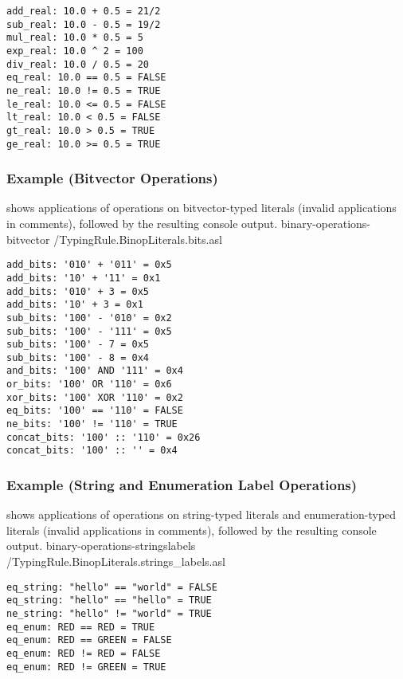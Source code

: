 \begin{Verbatim}[fontsize=\footnotesize, frame=single]
add_real: 10.0 + 0.5 = 21/2
sub_real: 10.0 - 0.5 = 19/2
mul_real: 10.0 * 0.5 = 5
exp_real: 10.0 ^ 2 = 100
div_real: 10.0 / 0.5 = 20
eq_real: 10.0 == 0.5 = FALSE
ne_real: 10.0 != 0.5 = TRUE
le_real: 10.0 <= 0.5 = FALSE
lt_real: 10.0 < 0.5 = FALSE
gt_real: 10.0 > 0.5 = TRUE
ge_real: 10.0 >= 0.5 = TRUE
\end{Verbatim}

\subsubsection{Example (Bitvector Operations)\label{sec:ExampleBitvectorOperations}}
 shows applications
of operations on bitvector-typed literals (invalid applications in comments),
followed by the resulting console output.
  {binary-operations-bitvector}
  {\typingtests/TypingRule.BinopLiterals.bits.asl}

\begin{Verbatim}[fontsize=\footnotesize, frame=single]
add_bits: '010' + '011' = 0x5
add_bits: '10' + '11' = 0x1
add_bits: '010' + 3 = 0x5
add_bits: '10' + 3 = 0x1
sub_bits: '100' - '010' = 0x2
sub_bits: '100' - '111' = 0x5
sub_bits: '100' - 7 = 0x5
sub_bits: '100' - 8 = 0x4
and_bits: '100' AND '111' = 0x4
or_bits: '100' OR '110' = 0x6
xor_bits: '100' XOR '110' = 0x2
eq_bits: '100' == '110' = FALSE
ne_bits: '100' != '110' = TRUE
concat_bits: '100' :: '110' = 0x26
concat_bits: '100' :: '' = 0x4
\end{Verbatim}

\subsubsection{Example (String and Enumeration Label Operations)\label{sec:StringLabelOperations}}
 shows applications
of operations on string-typed literals and enumeration-typed literals (invalid applications in comments),
followed by the resulting console output.
  {binary-operations-stringslabels}
  {\typingtests/TypingRule.BinopLiterals.strings_labels.asl}

\begin{Verbatim}[fontsize=\footnotesize, frame=single]
eq_string: "hello" == "world" = FALSE
eq_string: "hello" == "hello" = TRUE
ne_string: "hello" != "world" = TRUE
eq_enum: RED == RED = TRUE
eq_enum: RED == GREEN = FALSE
eq_enum: RED != RED = FALSE
eq_enum: RED != GREEN = TRUE
\end{Verbatim}

